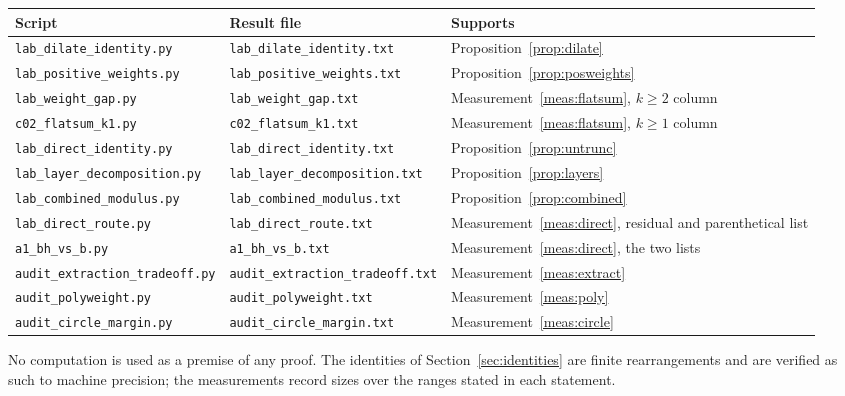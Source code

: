 \documentclass[11pt,a4paper]{article}
\theoremstyle{plain}
\theoremstyle{definition}
\theoremstyle{remark}
\begin{document}
\begin{center}
\begin{tabular}{lll}
\hline
Script & Result file & Supports\\
\hline
\texttt{lab\_dilate\_identity.py} & \texttt{lab\_dilate\_identity.txt}
 & Proposition~\ref{prop:dilate}\\
\texttt{lab\_positive\_weights.py} & \texttt{lab\_positive\_weights.txt}
 & Proposition~\ref{prop:posweights}\\
\texttt{lab\_weight\_gap.py} & \texttt{lab\_weight\_gap.txt}
 & Measurement~\ref{meas:flatsum}, $k\ge2$ column\\
\texttt{c02\_flatsum\_k1.py} & \texttt{c02\_flatsum\_k1.txt}
 & Measurement~\ref{meas:flatsum}, $k\ge1$ column\\
\texttt{lab\_direct\_identity.py} & \texttt{lab\_direct\_identity.txt}
 & Proposition~\ref{prop:untrunc}\\
\texttt{lab\_layer\_decomposition.py} &
 \texttt{lab\_layer\_decomposition.txt} & Proposition~\ref{prop:layers}\\
\texttt{lab\_combined\_modulus.py} & \texttt{lab\_combined\_modulus.txt}
 & Proposition~\ref{prop:combined}\\
\texttt{lab\_direct\_route.py} & \texttt{lab\_direct\_route.txt}
 & Measurement~\ref{meas:direct}, residual and parenthetical list\\
\texttt{a1\_bh\_vs\_b.py} & \texttt{a1\_bh\_vs\_b.txt}
 & Measurement~\ref{meas:direct}, the two lists\\
\texttt{audit\_extraction\_tradeoff.py} &
 \texttt{audit\_extraction\_tradeoff.txt} & Measurement~\ref{meas:extract}\\
\texttt{audit\_polyweight.py} & \texttt{audit\_polyweight.txt}
 & Measurement~\ref{meas:poly}\\
\texttt{audit\_circle\_margin.py} & \texttt{audit\_circle\_margin.txt}
 & Measurement~\ref{meas:circle}\\
\hline
\end{tabular}
\end{center}

No computation is used as a premise of any proof. The identities of
Section~\ref{sec:identities} are finite rearrangements and are
verified as such to machine precision; the measurements record sizes
over the ranges stated in each statement.
\end{document}
